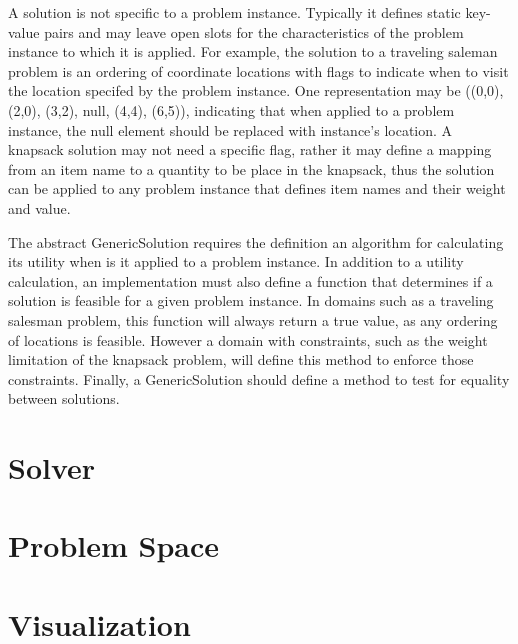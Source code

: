 A solution is not specific to a problem instance.  Typically it defines static key-value pairs and may leave open slots for the characteristics of the problem instance to which it is applied.  For example, the solution to a traveling saleman problem is an ordering of coordinate locations with flags to indicate when to visit the location specifed by the problem instance.  One representation may be  ((0,0), (2,0), (3,2), null, (4,4), (6,5)), indicating that when applied to a problem instance, the null element should be replaced with instance's location.  A knapsack solution may not need a specific flag, rather it may define a mapping from an item name to a quantity to be place in the knapsack, thus the solution can be applied to any problem instance that defines item names and their weight and value.

The abstract GenericSolution requires the definition an algorithm for calculating its utility when is it applied to a problem instance.  In addition to a utility calculation, an implementation must also define a function that determines if a solution is feasible for a given problem instance.  In domains such as a traveling salesman problem, this function will always return a true value, as any ordering of locations is feasible.  However a domain with constraints, such as the weight limitation of the knapsack problem, will define this method to enforce those constraints.  Finally, a GenericSolution should define a method to test for equality between solutions.

\section{Solver}

\section{Problem Space}

\section{Visualization}

